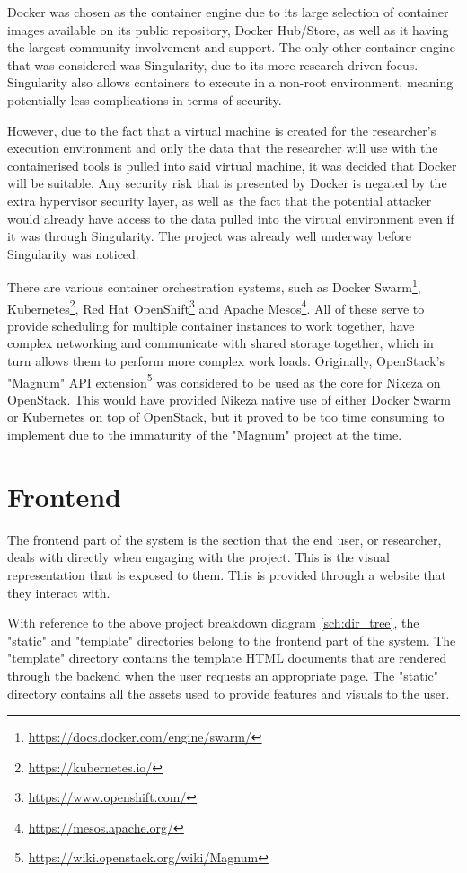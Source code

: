 Docker was chosen as the container engine due to its large selection of container images available on its public repository, Docker Hub/Store, as well as it having the largest community involvement and support. The only other container engine that was considered was Singularity, due to its more research driven focus. Singularity also allows containers to execute in a non-root environment, meaning potentially less complications in terms of security. 

However, due to the fact that a virtual machine is created for the researcher's execution environment and only the data that the researcher will use with the containerised tools is pulled into said virtual machine, it was decided that Docker will be suitable. Any security risk that is presented by Docker is negated by the extra hypervisor security layer, as well as the fact that the potential attacker would already have access to the data pulled into the virtual environment even if it was through Singularity. The project was already well underway before Singularity was noticed.

There are various container orchestration systems, such as Docker Swarm\footnote{\url{https://docs.docker.com/engine/swarm/}}, Kubernetes\footnote{\url{https://kubernetes.io/}}, Red Hat OpenShift\footnote{\url{https://www.openshift.com/}} and Apache Mesos\footnote{\url{https://mesos.apache.org/}}. All of these serve to provide scheduling for multiple container instances to work together, have complex networking and communicate with shared storage together, which in turn allows them to perform more complex work loads. Originally, OpenStack's "Magnum" API extension\footnote{\url{https://wiki.openstack.org/wiki/Magnum}} was considered to be used as the core for Nikeza on OpenStack. This would have provided Nikeza native use of either Docker Swarm or Kubernetes on top of OpenStack, but it proved to be too time consuming to implement due to the immaturity of the "Magnum" project at the time.

\section{Frontend}

The frontend part of the system is the section that the end user, or researcher, deals with directly when engaging with the project. This is the visual representation that is exposed to them. This is provided through a website that they interact with.

With reference to the above project breakdown diagram \ref{sch:dir_tree}, the "static" and "template" directories belong to the frontend part of the system. The "template" directory contains the template HTML documents that are rendered through the backend when the user requests an appropriate page. The "static" directory contains all the assets used to provide features and visuals to the user.


